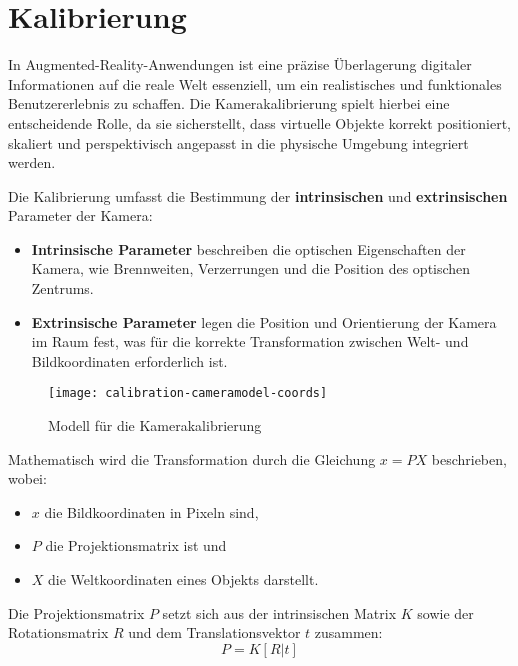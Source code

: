 \section{Kalibrierung}

In Augmented-Reality-Anwendungen ist eine präzise Überlagerung digitaler Informationen auf die reale Welt essenziell, um ein realistisches und funktionales Benutzererlebnis zu schaffen. Die Kamerakalibrierung spielt hierbei eine entscheidende Rolle, da sie sicherstellt, dass virtuelle Objekte korrekt positioniert, skaliert und perspektivisch angepasst in die physische Umgebung integriert werden.

Die Kalibrierung umfasst die Bestimmung der \textbf{intrinsischen} und \textbf{extrinsischen} Parameter der Kamera:

\begin{itemize}
    \item \textbf{Intrinsische Parameter} beschreiben die optischen Eigenschaften der Kamera, wie Brennweiten, Verzerrungen und die Position des optischen Zentrums.
    \item \textbf{Extrinsische Parameter} legen die Position und Orientierung der Kamera im Raum fest, was für die korrekte Transformation zwischen Welt- und Bildkoordinaten erforderlich ist.
\end{itemize}

\begin{figure}
    \centering
    \texttt{[image: calibration-cameramodel-coords]}
    \caption{Modell für die Kamerakalibrierung\label{fig:Kalibrierung}}\par
\end{figure}

Mathematisch wird die Transformation durch die Gleichung \( x = PX \) beschrieben, wobei:

\begin{itemize}
    \item \( x \) die Bildkoordinaten in Pixeln sind,
    \item \( P \) die Projektionsmatrix ist und
    \item \( X \) die Weltkoordinaten eines Objekts darstellt.
\end{itemize}

Die Projektionsmatrix \( P \) setzt sich aus der intrinsischen Matrix \( K \) sowie der Rotationsmatrix \( R \) und dem Translationsvektor \( t \) zusammen:
\[
P = K[R|t]
\]

